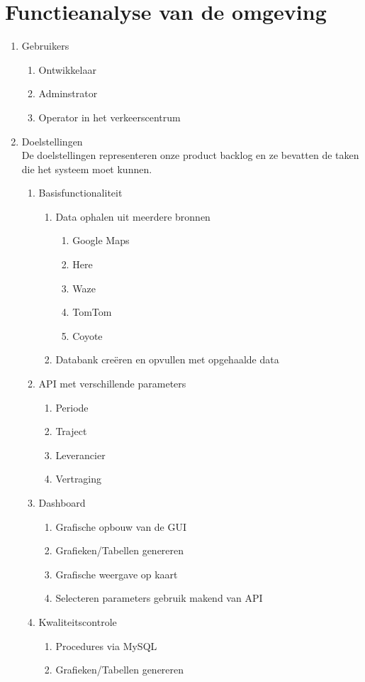 \documentclass[ps,a4paper,oneside]{report}
\begin{document}
\section{Functieanalyse van de omgeving}
\begin{enumerate}
	\item Gebruikers
	\begin{enumerate}
		\item Ontwikkelaar
		\item Adminstrator
		\item Operator in het verkeerscentrum
	\end{enumerate}
\item Doelstellingen\\
De doelstellingen representeren onze product backlog en ze bevatten de taken die het systeem moet kunnen.
\begin{enumerate}
	\item Basisfunctionaliteit
		\begin{enumerate}
			\item Data ophalen uit meerdere bronnen
			\begin{enumerate}
				\item Google Maps
				\item Here
				\item Waze
				\item TomTom
				\item Coyote
			\end{enumerate}
			\item Databank cre\"eren en opvullen met opgehaalde data
		\end{enumerate}
	\item API met verschillende parameters
	\begin{enumerate}
		\item Periode
		\item Traject
		\item Leverancier
		\item Vertraging
	\end{enumerate}
	\item Dashboard
	\begin{enumerate}
		\item Grafische opbouw van de GUI
		\item Grafieken/Tabellen genereren
		\item Grafische weergave op kaart
		\item Selecteren parameters gebruik makend van API
	\end{enumerate}	
	\item Kwaliteitscontrole
	\begin{enumerate}
		\item Procedures via MySQL
		\item Grafieken/Tabellen genereren
	\end{enumerate}
\end{enumerate}
\end{enumerate}
\end{document}
